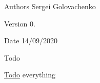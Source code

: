 \begin{DoxyAuthor}{Authors}
Sergei Golovachenko 
\end{DoxyAuthor}
\begin{DoxyVersion}{Version}
0. 
\end{DoxyVersion}
\begin{DoxyDate}{Date}
14/09/2020 
\end{DoxyDate}
\begin{DoxyRefDesc}{Todo}
\item[\mbox{\hyperlink{todo__todo000001}{Todo}}]everything \end{DoxyRefDesc}
